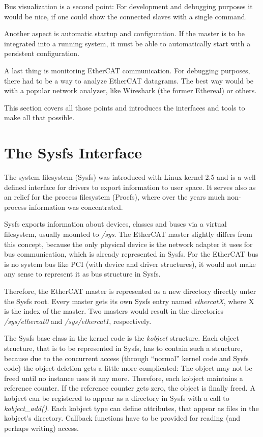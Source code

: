 \documentclass[a4paper,12pt,BCOR6mm,bibtotoc,idxtotoc]{scrbook}
\begin{document}
Bus visualization is a second point: For development and debugging
purposes it would be nice, if one could show the connected slaves with
a single command.

Another aspect is automatic startup and configuration. If the master
is to be integrated into a running system, it must be able to
automatically start with a persistent configuration.

A last thing is monitoring EtherCAT communication. For debugging
purposes, there had to be a way to analyze EtherCAT datagrams. The
best way would be with a popular network analyzer, like Wireshark
\cite{wireshark} (the former Ethereal) or others.

This section covers all those points and introduces the interfaces and
tools to make all that possible.


\section{The Sysfs Interface}
\label{sec:sysfs}

The system filesystem (Sysfs) was introduced with Linux
kernel 2.5 and is a well-defined interface for drivers to export
information to user space. It serves also as an relief for the process
filesystem (Procfs), where over the years much non-process information
was concentrated.

Sysfs exports information about devices, classes and buses via a
virtual filesystem, usually mounted to \textit{/sys}. The EtherCAT
master slightly differs from this concept, because the only physical
device is the network adapter it uses for bus communication, which is
already represented in Sysfs. For the EtherCAT bus is no system bus
like PCI (with device and driver structures), it would not make any
sense to represent it as bus structure in Sysfs.

Therefore, the EtherCAT master is represented as a new directory
directly unter the Sysfs root. Every master gets its own Sysfs entry
named \textit{ethercatX}, where X is the index of the master. Two
masters would result in the directories \textit{/sys/ethercat0} and
\textit{/sys/ethercat1}, respectively.

The Sysfs base class in the kernel code is the \textit{kobject}
structure. Each object structure, that is to be represented in Sysfs,
has to contain such a structure, because due to the concurrent access
(through ``normal'' kernel code and Sysfs code) the object deletion
gets a little more complicated: The object may not be freed until no
instance uses it any more. Therefore, each kobject maintains a
reference counter. If the reference counter gets zero, the object is
finally freed. A kobject can be registered to appear as a directory in
Sysfs with a call to \textit{kobject\_add()}. Each kobject type can
define attributes, that appear as files in the kobject's
directory. Callback functions have to be provided for reading (and
perhaps writing) access.
\end{document}

